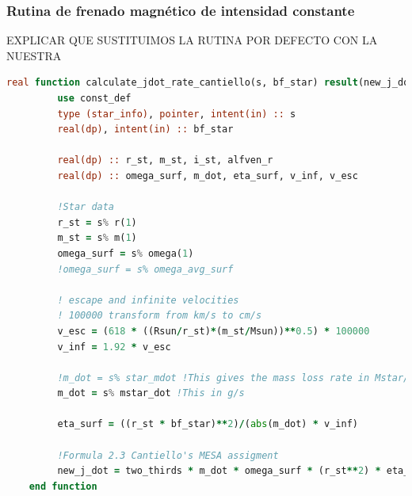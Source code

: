 \subsubsection{Rutina de frenado magnético de intensidad constante}
EXPLICAR QUE SUSTITUIMOS LA RUTINA POR DEFECTO CON LA NUESTRA
\begin{lstlisting}[language=Fortran, caption={Rutina de par de torsión.}, label={lst:jdot_cantiello}]
      real function calculate_jdot_rate_cantiello(s, bf_star) result(new_j_dot)
         use const_def
         type (star_info), pointer, intent(in) :: s
         real(dp), intent(in) :: bf_star

         real(dp) :: r_st, m_st, i_st, alfven_r
         real(dp) :: omega_surf, m_dot, eta_surf, v_inf, v_esc

         !Star data
         r_st = s% r(1)
         m_st = s% m(1)
         omega_surf = s% omega(1)
         !omega_surf = s% omega_avg_surf

         ! escape and infinite velocities
         ! 100000 transform from km/s to cm/s
         v_esc = (618 * ((Rsun/r_st)*(m_st/Msun))**0.5) * 100000
         v_inf = 1.92 * v_esc

         !m_dot = s% star_mdot !This gives the mass loss rate in Mstar/year
         m_dot = s% mstar_dot !This in g/s

         eta_surf = ((r_st * bf_star)**2)/(abs(m_dot) * v_inf)

         !Formula 2.3 Cantiello's MESA assigment
         new_j_dot = two_thirds * m_dot * omega_surf * (r_st**2) * eta_surf
    end function
\end{lstlisting}


